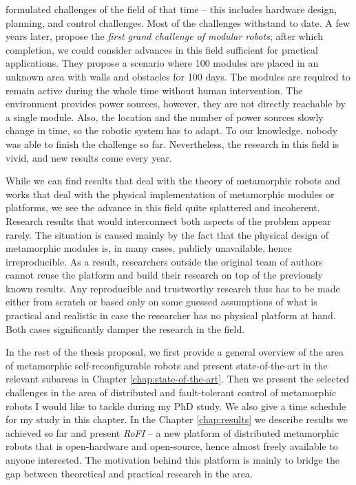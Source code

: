\textcite{4141032} formulated challenges of the field of that time -- this
includes hardware design, planning, and control challenges. Most of the
challenges withstand to date. A few years later,
\textcite{DBLP:journals/corr/abs-1108-5543} propose the \emph{first grand
challenge of modular robots}; after which completion, we could consider advances
in this field sufficient for practical applications. They propose a scenario
where 100 modules are placed in an unknown area with walls and obstacles for 100
days. The modules are required to remain active during the whole time without
human intervention. The environment provides power sources, however, they are
not directly reachable by a single module. Also, the location and the number of
power sources slowly change in time, so the robotic system has to adapt. To
our knowledge, nobody was able to finish the challenge so far. Nevertheless, the
research in this field is vivid, and new results come every year.

While we can find results that deal with the theory of metamorphic robots and
works that deal with the physical implementation of metamorphic modules or
platforms, we see the advance in this field quite splattered and incoherent.
Research results that would interconnect both aspects of the problem appear
rarely. The situation is caused mainly by the fact that the physical design of
metamorphic modules is, in many cases, publicly unavailable, hence
irreproducible. As a result, researchers outside the original team of authors
cannot reuse the platform and build their research on top of the previously
known results.  Any reproducible and trustworthy research thus has to be made
either from scratch or based only on some guessed assumptions of what is
practical and realistic in case the researcher has no physical platform at hand.
Both cases significantly damper the research in the field.

In the rest of the thesis proposal, we first provide a general overview of the
area of metamorphic self-reconfigurable robots and present state-of-the-art in
the relevant subareas in Chapter \ref{chap:state-of-the-art}. Then we present
the selected challenges in the area of distributed and fault-tolerant control of
metamorphic robots I would like to tackle during my PhD study. We also give a
time schedule for my study in this chapter. In the Chapter \ref{chap:results} we
describe results we achieved so far and present \emph{RoFI} -- a new platform of
distributed metamorphic robots that is open-hardware and open-source, hence
almost freely available to anyone interested. The motivation behind this
platform is mainly to bridge the gap between theoretical and practical research
in the area.
